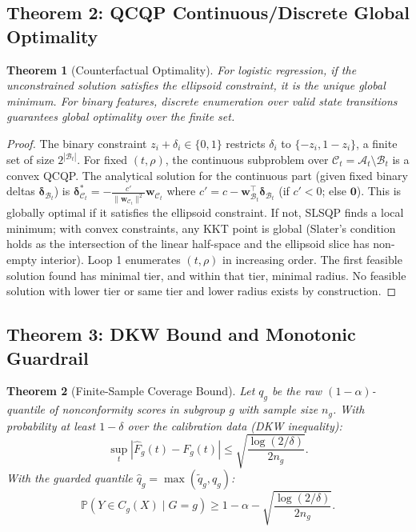 \documentclass[11pt,a4paper]{article}
\theoremstyle{plain}
\newtheorem{theorem}{Theorem}
\begin{document}
\subsection{Theorem 2: QCQP Continuous/Discrete Global Optimality}

\begin{theorem}[Counterfactual Optimality]
For logistic regression, if the unconstrained solution satisfies the ellipsoid constraint, it is the unique global minimum. For binary features, discrete enumeration over valid state transitions guarantees global optimality over the finite set.
\end{theorem}

\begin{proof}
The binary constraint $z_i + \delta_i \in \{0,1\}$ restricts $\delta_i$ to $\{-z_i, 1-z_i\}$, a finite set of size $2^{|\mathcal B_t|}$. For fixed $(t,\rho)$, the continuous subproblem over $\mathcal C_t = \mathcal A_t \setminus \mathcal B_t$ is a convex QCQP. The analytical solution for the continuous part (given fixed binary deltas $\boldsymbol\delta_{\mathcal B_t}$) is $\boldsymbol\delta_{\mathcal C_t}^* = -\frac{c'}{\|\mathbf w_{\mathcal C_t}\|^2}\mathbf w_{\mathcal C_t}$ where $c' = c - \mathbf w_{\mathcal B_t}^\top \boldsymbol\delta_{\mathcal B_t}$ (if $c' < 0$; else $\mathbf 0$). This is globally optimal if it satisfies the ellipsoid constraint. If not, SLSQP finds a local minimum; with convex constraints, any KKT point is global (Slater's condition holds as the intersection of the linear half-space and the ellipsoid slice has non-empty interior). Loop 1 enumerates $(t,\rho)$ in increasing order. The first feasible solution found has minimal tier, and within that tier, minimal radius. No feasible solution with lower tier or same tier and lower radius exists by construction.
\end{proof}

\subsection{Theorem 3: DKW Bound and Monotonic Guardrail}

\begin{theorem}[Finite-Sample Coverage Bound]
Let $q_g$ be the raw $(1-\alpha)$-quantile of nonconformity scores in subgroup $g$ with sample size $n_g$. With probability at least $1-\delta$ over the calibration data (DKW inequality):
\begin{equation}
\sup_t |\hat F_g(t) - F_g(t)| \le \sqrt{\frac{\log(2/\delta)}{2n_g}}.
\end{equation}
With the guarded quantile $\hat q_g = \max(\tilde q_g, q_g)$:
\begin{equation}
\mathbb{P}(Y \in C_g(X) \mid G=g) \ge 1-\alpha - \sqrt{\frac{\log(2/\delta)}{2n_g}}.
\end{equation}
\end{theorem}
\end{document}
